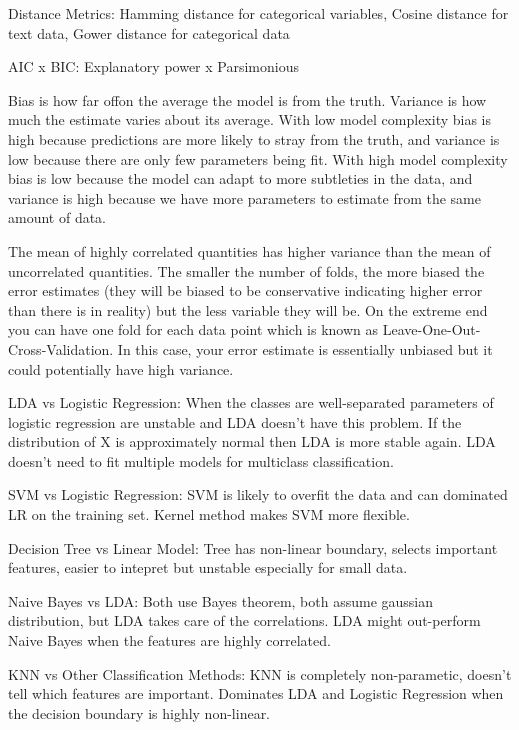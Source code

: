 \documentclass[]{book}
\begin{document}
Distance Metrics: Hamming distance for categorical variables, Cosine distance for text data, Gower distance for categorical data

AIC x BIC: Explanatory power x Parsimonious

Bias is how far offon the average the model is from the truth. Variance is how much the estimate varies about its average. With low model complexity bias is high because predictions are more likely to stray from the truth, and variance is low because there are only few parameters being fit. With high model complexity bias is low because the model can adapt to more subtleties in the data, and variance is high because we have more parameters to estimate from the same amount of data.

The mean of highly correlated quantities has higher variance than the mean of uncorrelated quantities. The smaller the number of folds, the more biased the error estimates (they will be biased to be conservative indicating higher error than there is in reality) but the less variable they will be. On the extreme end you can have one fold for each data point which is known as Leave-One-Out-Cross-Validation. In this case, your error estimate is essentially unbiased but it could potentially have high variance.

LDA vs Logistic Regression: When the classes are well-separated parameters of logistic regression are unstable and LDA doesn't have this problem. If the distribution of X is approximately normal then LDA is more stable again. LDA doesn't need to fit multiple models for multiclass classification.

SVM vs Logistic Regression: SVM is likely to overfit the data and can dominated LR on the training set. Kernel method makes SVM more flexible.

Decision Tree vs Linear Model: Tree has non-linear boundary, selects important features, easier to intepret but unstable especially for small data.

Naive Bayes vs LDA: Both use Bayes theorem, both assume gaussian distribution, but LDA takes care of the correlations. LDA might out-perform Naive Bayes when the features are highly correlated.

KNN vs Other Classification Methods: KNN is completely non-parametic, doesn't tell which features are important. Dominates LDA and Logistic Regression when the decision boundary is highly non-linear.
\end{document}
